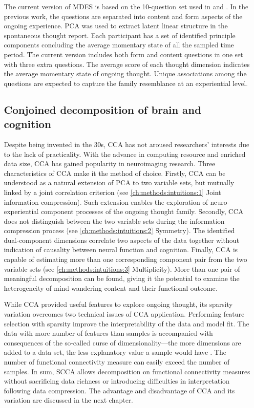 The current version of MDES is based on the 10-question set used in  and . In the previous work, the questions are separated into content and form aspects of the ongoing experience. PCA was used to extract latent linear structure in the spontaneous thought report. Each participant has a set of identified principle components concluding the average momentary state of all the sampled time period. The current version includes both form and content questions in one set with three extra questions. The average score of each thought dimension indicates the average momentary state of ongoing thought. Unique associations among the questions are expected to capture the family resemblance at an experiential level. 

% 

\subsection{Conjoined decomposition of brain and cognition}

Despite being invented in the 30s, CCA has not aroused researchers’ interests due to the lack of practicality. With the advance in computing resource and enriched data size, CCA has gained popularity in neuroimaging research. Three characteristics of CCA make it the method of choice. Firstly, CCA can be understood as a natural extension of PCA to two variable sets, but mutually linked by a joint correlation criterion (see \ref{ch:methods:intuitions:1} Joint information compression). Such extension enables the exploration of neuro-experiential component processes of the ongoing thought family. Secondly, CCA does not distinguish between the two variable sets during the information compression process (see \ref{ch:methods:intuitions:2} Symmetry). The identified dual-component dimensions correlate two aspects of the data together without indication of causality between neural function and cognition. Finally, CCA is capable of estimating more than one corresponding component pair from the two variable sets (see \ref{ch:methods:intuitions:3} Multiplicity). More than one pair of meaningful decomposition can be found, giving it the potential to examine the heterogeneity of mind-wandering content and their functional outcome. 

While CCA provided useful features to explore ongoing thought, its sparsity variation overcomes two technical issues of CCA application. Performing feature selection with sparsity improve the interpretability of the data and model fit. The data with more number of features than samples is accompanied with consequences of the so-called curse of dimensionality---the more dimensions are added to a data set, the less explanatory value a sample would have \cite{Domingos2012}. The number of functional connectivity measure can easily exceed the number of samples. In sum, SCCA allows decomposition on functional connectivity measures without sacrificing data richness or introducing difficulties in interpretation following data compression. The advantage and disadvantage of CCA and its variation are discussed in the next chapter.

